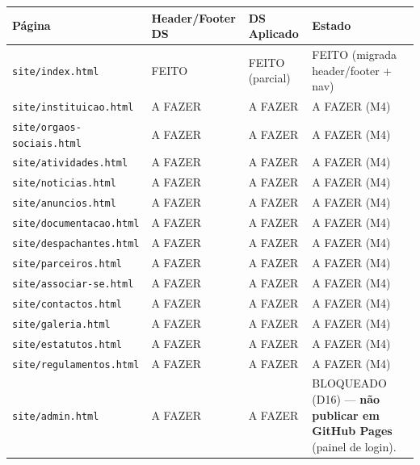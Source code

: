 {\def\LTcaptype{none} %
\begin{longtable}[]{@{}
  >{\raggedright\arraybackslash}p{}
  >{\raggedright\arraybackslash}p{}
  >{\raggedright\arraybackslash}p{}
  >{\raggedright\arraybackslash}p{}@{}}
\toprule\noalign{}
\begin{minipage}[b]{\linewidth}\raggedright
Página
\end{minipage} & \begin{minipage}[b]{\linewidth}\raggedright
Header/Footer DS
\end{minipage} & \begin{minipage}[b]{\linewidth}\raggedright
DS Aplicado
\end{minipage} & \begin{minipage}[b]{\linewidth}\raggedright
Estado
\end{minipage} \\
\midrule\noalign{}
\endhead
\bottomrule\noalign{}
\endlastfoot
\texttt{site/index.html} & {FEITO} & {FEITO (parcial)} & {FEITO}
(migrada header/footer + nav) \\
\texttt{site/instituicao.html} & {A FAZER} & {A FAZER} & {A FAZER}
(M4) \\
\texttt{site/orgaos-sociais.html} & {A FAZER} & {A FAZER} & {A FAZER}
(M4) \\
\texttt{site/atividades.html} & {A FAZER} & {A FAZER} & {A FAZER}
(M4) \\
\texttt{site/noticias.html} & {A FAZER} & {A FAZER} & {A FAZER} (M4) \\
\texttt{site/anuncios.html} & {A FAZER} & {A FAZER} & {A FAZER} (M4) \\
\texttt{site/documentacao.html} & {A FAZER} & {A FAZER} & {A FAZER}
(M4) \\
\texttt{site/despachantes.html} & {A FAZER} & {A FAZER} & {A FAZER}
(M4) \\
\texttt{site/parceiros.html} & {A FAZER} & {A FAZER} & {A FAZER} (M4) \\
\texttt{site/associar-se.html} & {A FAZER} & {A FAZER} & {A FAZER}
(M4) \\
\texttt{site/contactos.html} & {A FAZER} & {A FAZER} & {A FAZER} (M4) \\
\texttt{site/galeria.html} & {A FAZER} & {A FAZER} & {A FAZER} (M4) \\
\texttt{site/estatutos.html} & {A FAZER} & {A FAZER} & {A FAZER} (M4) \\
\texttt{site/regulamentos.html} & {A FAZER} & {A FAZER} & {A FAZER}
(M4) \\
\texttt{site/admin.html} & {A FAZER} & {A FAZER} & {BLOQUEADO (D16)} ---
\textbf{não publicar em GitHub Pages} (painel de login). \\
\end{longtable}
}

